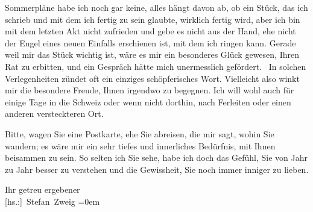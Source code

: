\pstart
           Sommerpläne habe ich noch gar keine, alles hängt davon ab, ob ein Stück, das ich schrieb und mit dem ich
               fertig zu sein glaubte, wirklich fertig wird, aber ich bin mit dem letzten Akt nicht
               zufrieden und gebe es nicht aus der Hand, ehe nicht der  Engel eines neuen Einfalls erschienen ist, mit dem ich ringen
               kann. Gerade weil mir das Stück wichtig ist, wäre es mir ein besonderes Glück gewesen, Ihren Rat zu
               erbitten, und ein Gespräch hätte mich unermesslich gefördert.  \introOben{}I\introOben{}n solchen Verlegenheiten zündet oft ein einziges
               schöpferisches Wort. Vielleicht also winkt mir die besondere Freude, Ihnen irgendwo
               zu begegnen. Ich will wohl auch für einige Tage in die Schweiz oder wenn nicht dorthin, nach Ferleiten oder einen anderen versteckteren Ort.\pend
           
\pstart
           Bitte, wagen Sie eine Postkarte, ehe Sie abreisen, die mir sagt, wohin Sie wandern;
               es wäre mir ein sehr tiefes und innerliches Bedürfnis, mit Ihnen beisammen zu sein.
               So selten ich Sie sehe, habe ich doch das Gefühl, Sie von Jahr zu Jahr besser zu
               verstehen und die Gewissheit, Sie noch immer inniger zu lieben.\pend
           
\pstart
           Ihr getreu ergebener{\\[\baselineskip]}\spacefill\mbox{{[}hs.:{]} Stefan Zweig}\pend
           \leftskip=0em{}\endnumbering{}
\begin{anhang}
\end{anhang}
      